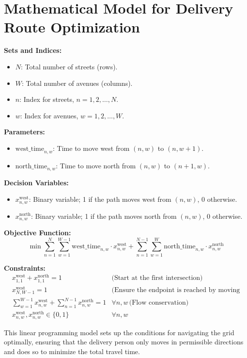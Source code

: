 \documentclass{article}
\begin{document}
\section*{Mathematical Model for Delivery Route Optimization}

\textbf{Sets and Indices:}
\begin{itemize}
    \item $N$: Total number of streets (rows).
    \item $W$: Total number of avenues (columns).
    \item $n$: Index for streets, $n = 1, 2, \ldots, N$.
    \item $w$: Index for avenues, $w = 1, 2, \ldots, W$.
\end{itemize}

\textbf{Parameters:}
\begin{itemize}
    \item $\text{west\_time}_{n,w}$: Time to move west from $(n, w)$ to $(n, w+1)$.
    \item $\text{north\_time}_{n,w}$: Time to move north from $(n, w)$ to $(n+1, w)$.
\end{itemize}

\textbf{Decision Variables:}
\begin{itemize}
    \item $x_{n,w}^{\text{west}}$: Binary variable; 1 if the path moves west from $(n, w)$, 0 otherwise.
    \item $x_{n,w}^{\text{north}}$: Binary variable; 1 if the path moves north from $(n, w)$, 0 otherwise.
\end{itemize}

\textbf{Objective Function:}
\[
\min \sum_{n=1}^{N} \sum_{w=1}^{W-1} \text{west\_time}_{n,w} \cdot x_{n,w}^{\text{west}} + 
    \sum_{n=1}^{N-1} \sum_{w=1}^{W} \text{north\_time}_{n,w} \cdot x_{n,w}^{\text{north}}
\]

\textbf{Constraints:}
\begin{align}
    & x_{1,1}^{\text{west}} + x_{1,1}^{\text{north}} = 1 & \text{(Start at the first intersection)} \\
    & x_{N,W-1}^{\text{west}} = 1 & \text{(Ensure the endpoint is reached by moving west)} \\
    & \sum_{w=1}^{W-1} x_{n,w}^{\text{west}} + \sum_{n=1}^{N-1} x_{n,w}^{\text{north}} = 1 & \forall n, w \, \text{(Flow conservation)} \\
    & x_{n,w}^{\text{west}}, x_{n,w}^{\text{north}} \in \{0, 1\} & \forall n, w
\end{align}

This linear programming model sets up the conditions for navigating the grid optimally, ensuring that the delivery person only moves in permissible directions and does so to minimize the total travel time.
\end{document}
